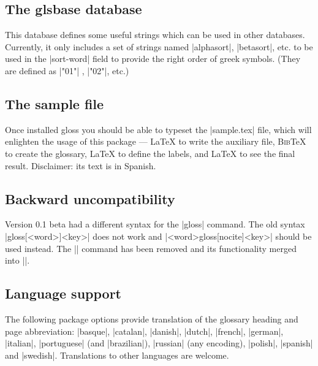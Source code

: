 \documentclass{ltxguide}
\newcommand{\gloss}{\textsf{gloss}}
\newcommand{\bibTeX}{\textsc{Bib}\TeX}
\begin{document}
\subsection{The \textsf{glsbase} database}

This database defines some useful strings which can be used
in other databases. Currently, it only includes a set of
strings named |alphasort|, |betasort|, etc. to be used
in the |sort-word| field to provide the right order of
greek symbols. (They are defined as |"01"| , |"02"|, etc.)

\subsection{The sample file}

Once installed \gloss{} you should be able to typeset the
|sample.tex| file, which will enlighten the usage
of this package --- \LaTeX{} to write the auxiliary file, \bibTeX{}
to create the glossary, \LaTeX{} to define the labels, and \LaTeX{}
to see the final result. Disclaimer: its text is in Spanish.

\subsection{Backward uncompatibility}

Version 0.1 beta had a different syntax for the |\gloss| 
command. The old syntax |\gloss[<word>]{<key>}| does not work
and |<word>\gloss[nocite]{<key>}| should be used instead. The
|\glossstyle| command has been removed and its functionality
merged into |\newgloss|.

\subsection{Language support}

The following package options provide translation of the glossary 
heading and page abbreviation: |basque|, |catalan|, |danish|, |dutch|, 
|french|, |german|, |italian|, |portuguese| (and |brazilian|), 
|russian| (any encoding), |polish|, |spanish| and |swedish|.  
Translations to other languages are welcome.
\end{document}
